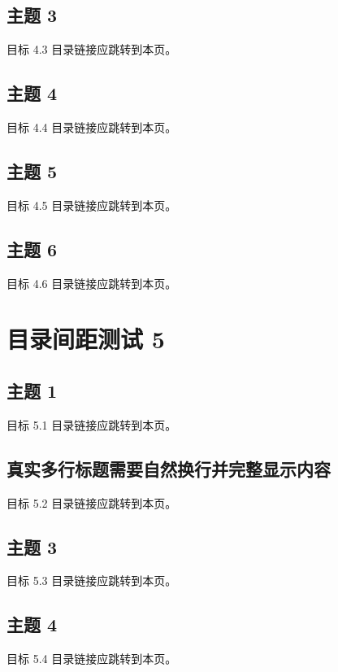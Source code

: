 \documentclass[navigation=false]{campusbeamer}
\begin{document}
\subsection{主题 3}
\begin{frame}{目标 4.3}
目录链接应跳转到本页。
\end{frame}
\subsection{主题 4}
\begin{frame}{目标 4.4}
目录链接应跳转到本页。
\end{frame}
\subsection{主题 5}
\begin{frame}{目标 4.5}
目录链接应跳转到本页。
\end{frame}
\subsection{主题 6}
\begin{frame}{目标 4.6}
目录链接应跳转到本页。
\end{frame}
\section{目录间距测试 5}
\sectioncoverpage[primary]{}
\subsection{主题 1}
\begin{frame}{目标 5.1}
目录链接应跳转到本页。
\end{frame}
\subsection{真实多行标题需要自然换行并完整显示内容}
\begin{frame}{目标 5.2}
目录链接应跳转到本页。
\end{frame}
\subsection{主题 3}
\begin{frame}{目标 5.3}
目录链接应跳转到本页。
\end{frame}
\subsection{主题 4}
\begin{frame}{目标 5.4}
目录链接应跳转到本页。
\end{frame}
\end{document}
